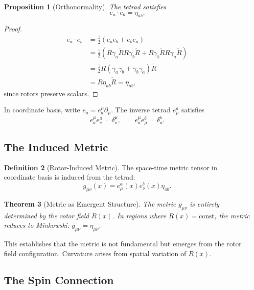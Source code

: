 \documentclass[11pt,a4paper]{article}
\numberwithin{equation}{section}
\theoremstyle{plain}
\newtheorem{theorem}{Theorem}[section]
\newtheorem{proposition}[theorem]{Proposition}
\theoremstyle{definition}
\newtheorem{definition}[theorem]{Definition}
\theoremstyle{remark}
\newcommand{\rev}[1]{\widetilde{#1}}       %
\begin{document}
\begin{proposition}[Orthonormality]
The tetrad satisfies
\begin{equation}
e_a \cdot e_b = \eta_{ab}.
\end{equation}
\end{proposition}

\begin{proof}
\begin{align}
e_a \cdot e_b &= \frac{1}{2}(e_a e_b + e_b e_a)\\
&= \frac{1}{2}\left(R\gamma_a\rev{R} R\gamma_b\rev{R} + R\gamma_b\rev{R} R\gamma_a\rev{R}\right)\\
&= \frac{1}{2}R(\gamma_a\gamma_b + \gamma_b\gamma_a)\rev{R}\\
&= R \eta_{ab} \rev{R} = \eta_{ab},
\end{align}
since rotors preserve scalars.
\end{proof}

In coordinate basis, write $e_a = e_a^\mu \partial_\mu$. The inverse tetrad $e^a_\mu$ satisfies
\begin{equation}
e_a^\mu e^a_\nu = \delta^\mu_\nu, \qquad e_a^\mu e^b_\mu = \delta^b_a.
\end{equation}

\subsection{The Induced Metric}

\begin{definition}[Rotor-Induced Metric]
The space-time metric tensor in coordinate basis is induced from the tetrad:
\begin{equation}
g_{\mu\nu}(x) = e_\mu^a(x) e_\nu^b(x) \eta_{ab}.
\label{eq:induced-metric}
\end{equation}
\end{definition}

\begin{theorem}[Metric as Emergent Structure]
The metric $g_{\mu\nu}$ is entirely determined by the rotor field $R(x)$. In regions where $R(x) = \mathrm{const}$, the metric reduces to Minkowski: $g_{\mu\nu} = \eta_{\mu\nu}$.
\end{theorem}

This establishes that the metric is not fundamental but emerges from the rotor field configuration. Curvature arises from spatial variation of $R(x)$.

\subsection{The Spin Connection}
\end{document}
